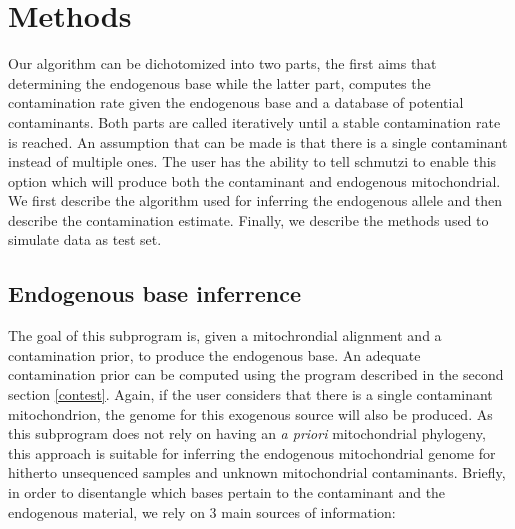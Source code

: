 \documentclass[a4paper,12pt]{article}
\begin{document}


\section{Methods}

Our algorithm can be dichotomized into two parts, the first aims that determining the endogenous base while the latter part, computes the contamination rate given the endogenous base and a database of potential contaminants. Both parts are called iteratively until a stable contamination rate is reached. An assumption that can be made is that there is a single contaminant instead of multiple ones. The user has the ability to tell schmutzi to enable this option which will produce both the contaminant and endogenous mitochondrial. We first describe the algorithm used for inferring the endogenous allele and then describe the contamination estimate. Finally, we describe the methods used to simulate data as test set. 
















\subsection{Endogenous base inferrence}

\label{sec:endogenous}
The goal of this subprogram is, given a mitochrondial alignment and a contamination prior, to produce the endogenous base. An adequate contamination prior can be computed using the program described in the second section \ref{contest}. Again, if the user considers that there is a single contaminant mitochondrion, the genome for this exogenous source will also be produced. As this subprogram does not rely on having an {\it a priori}  mitochondrial phylogeny, this approach is suitable for inferring the endogenous mitochondrial genome for hitherto unsequenced samples and unknown mitochondrial contaminants. Briefly, in order to disentangle which bases pertain to the contaminant and the endogenous material, we rely on 3 main sources of information:
\end{document}
